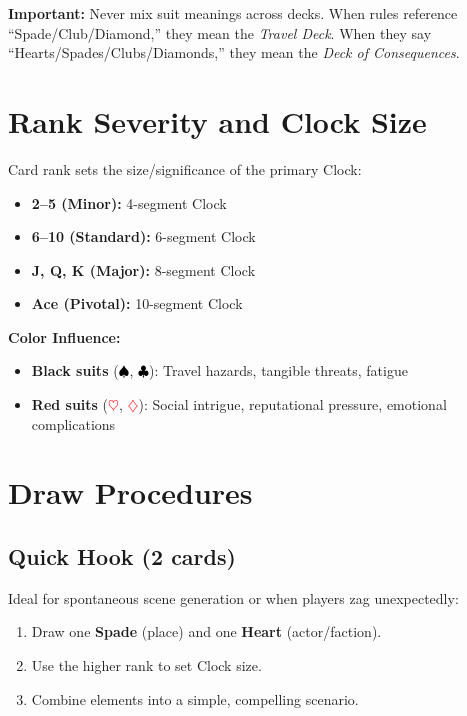 \noindent\textbf{Important:} Never mix suit meanings across decks. When rules reference ``Spade/Club/Diamond,'' they mean the \emph{Travel Deck}. When they say ``Hearts/Spades/Clubs/Diamonds,'' they mean the \emph{Deck of Consequences}.

\section{Rank Severity and Clock Size}
\label{sec:rank-severity}

Card rank sets the size/significance of the primary Clock:

\begin{itemize}
\item \textbf{2--5 (Minor):} 4-segment Clock 
\item \textbf{6--10 (Standard):} 6-segment Clock 
\item \textbf{J, Q, K (Major):} 8-segment Clock 
\item \textbf{Ace (Pivotal):} 10-segment Clock 
\end{itemize}

\textbf{Color Influence:}
\begin{itemize}
\item \textbf{Black suits} (\textcolor{black}{$\spadesuit$}, \textcolor{black}{$\clubsuit$}): Travel hazards, tangible threats, fatigue 
\item \textbf{Red suits} (\textcolor{red}{$\heartsuit$}, \textcolor{red}{$\diamondsuit$}): Social intrigue, reputational pressure, emotional complications 
\end{itemize}

\section{Draw Procedures}
\label{sec:draw-procedures}

\subsection{Quick Hook (2 cards)}
\label{subsec:quick-hook}

Ideal for spontaneous scene generation or when players zag unexpectedly:
\begin{enumerate}
\item Draw one \textbf{Spade} (place) and one \textbf{Heart} (actor/faction).
\item Use the higher rank to set Clock size.
\item Combine elements into a simple, compelling scenario.
\end{enumerate}

